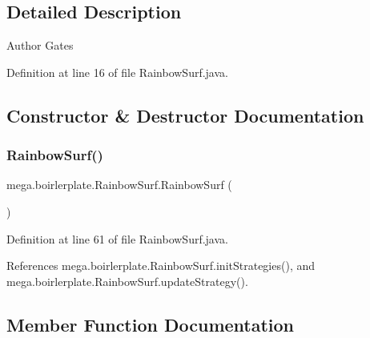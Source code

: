 \subsection{Detailed Description}
\begin{DoxyAuthor}{Author}
Gates 
\end{DoxyAuthor}


Definition at line 16 of file Rainbow\+Surf.\+java.



\subsection{Constructor \& Destructor Documentation}
\mbox{\label{classmega_1_1boirlerplate_1_1_rainbow_surf_ac796f78a606c23cc5d868106e7ff2e25}} 
\subsubsection{\texorpdfstring{Rainbow\+Surf()}{RainbowSurf()}}
{\footnotesize\ttfamily mega.\+boirlerplate.\+Rainbow\+Surf.\+Rainbow\+Surf (\begin{DoxyParamCaption}{ }\end{DoxyParamCaption})}



Definition at line 61 of file Rainbow\+Surf.\+java.



References mega.\+boirlerplate.\+Rainbow\+Surf.\+init\+Strategies(), and mega.\+boirlerplate.\+Rainbow\+Surf.\+update\+Strategy().



\subsection{Member Function Documentation}
\mbox{\label{classmega_1_1boirlerplate_1_1_rainbow_surf_a41d9a00a7815f330e689cfe289f8900d}} 
